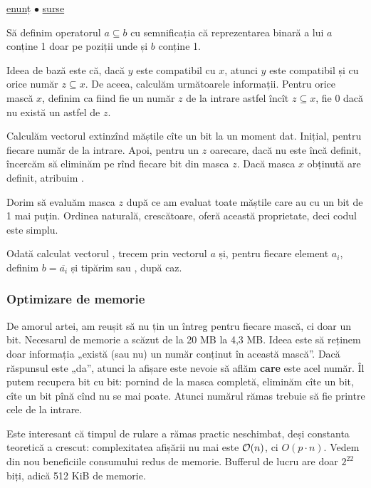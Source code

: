 \documentclass[../main.tex]{subfiles}
\begin{document}
\href{https://codeforces.com/contest/165/problem/E}{enunț}
$\bullet$
\hyperref[code:compatible-numbers]{surse}

Să definim operatorul $a \subseteq b$ cu semnificația că reprezentarea binară a lui $a$ conține 1 doar pe poziții unde și $b$ conține 1.

Ideea de bază este că, dacă $y$ este compatibil cu $x$, atunci $y$ este compatibil și cu orice număr $z \subseteq x$. De aceea, calculăm următoarele informații. Pentru orice mască $x$, definim  ca fiind fie un număr $z$ de la intrare astfel încît \(z \subseteq x\), fie 0 dacă nu există un astfel de $z$.

Calculăm vectorul  extinzînd măștile cîte un bit la un moment dat. Inițial,  pentru fiecare număr de la intrare. Apoi, pentru un $z$ oarecare, dacă  nu este încă definit, încercăm să eliminăm pe rînd fiecare bit din masca $z$. Dacă masca $x$ obținută are  definit, atribuim .

Dorim să evaluăm masca $z$ după ce am evaluat toate măștile care au cu un bit de 1 mai puțin. Ordinea naturală, crescătoare, oferă această proprietate, deci codul este simplu.

Odată calculat vectorul , trecem prin vectorul $a$ și, pentru fiecare element $a_i$, definim $b = \overline{a_i}$ și tipărim  sau , după caz.

\subsubsection*{Optimizare de memorie}

De amorul artei, am reușit să nu țin un întreg pentru fiecare mască, ci doar un bit. Necesarul de memorie a scăzut de la 20 MB la 4,3 MB. Ideea este să reținem doar informația „există (sau nu) un număr conținut în această mască”. Dacă răspunsul este „da”, atunci la afișare este nevoie să aflăm \textbf{care} este acel număr. Îl putem recupera bit cu bit: pornind de la masca completă, eliminăm cîte un bit, cîte un bit pînă cînd nu se mai poate. Atunci numărul rămas trebuie să fie printre cele de la intrare.

Este interesant că timpul de rulare a rămas practic neschimbat, deși constanta teoretică a crescut: complexitatea afișării nu mai este $\mathcal{O}(n)$, ci $O(p \cdot n)$. Vedem din nou beneficiile consumului redus de memorie. Bufferul de lucru are doar $2^{22}$ biți, adică 512 KiB de memorie.
\end{document}
